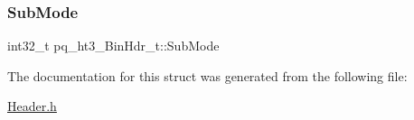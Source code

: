 \mbox{\label{structpq__ht3___bin_hdr__t_aa13b5295313e4959e214bbeffc09b9e7}} 
\subsubsection{\texorpdfstring{Sub\+Mode}{SubMode}}
{\footnotesize\ttfamily int32\+\_\+t pq\+\_\+ht3\+\_\+\+Bin\+Hdr\+\_\+t\+::\+Sub\+Mode}



The documentation for this struct was generated from the following file\+:\begin{DoxyCompactItemize}
\item 
\hyperlink{_header_8h}{Header.\+h}\end{DoxyCompactItemize}

